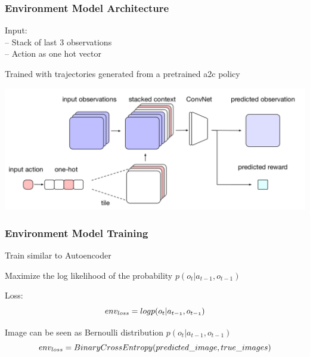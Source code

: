 \begin{frame}
    \frametitle{Environment Model Architecture}

\begin{multicols}{2}
	\begin{PraesentationAufzaehlung}
		\item Input:\\
		-- Stack of last 3 observations\\
		-- Action as one hot vector\\
		\item Trained with trajectories generated from a pretrained a2c policy
	\end{PraesentationAufzaehlung}
    \vfill\columnbreak
	\begin{center}
    \includegraphics[width=\columnwidth]{./Images/environment_model_architecture.png}%
	\end{center}
\end{multicols}
    
\end{frame}
\clearpage




\begin{frame}
    \frametitle{Environment Model Training}

\begin{PraesentationAufzaehlung}
	\item Train similar to Autoencoder
	\item Maximize the log likelihood of the probability $p(o_t | a_{t-1}, o_{t-1})$
	\item Loss:\\
	\begin{equation}
	\mathnormal{
	env_{loss} = log p(o_t | a_{t-1}, o_{t-1})}
	\end{equation}	
	\item Image can be seen as Bernoulli distribution $p(o_t | a_{t-1}, o_{t-1})$
	\begin{equation}
	\mathnormal{
	env_{loss} = Binary Cross Entropy(predicted\_image, true\_images)
	}
	\end{equation}
\end{PraesentationAufzaehlung}
    
\end{frame}
\clearpage



